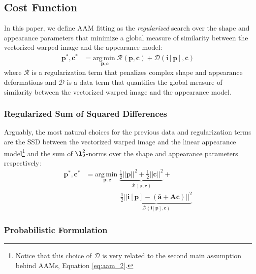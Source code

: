 \subsection{Cost Function}
\label{sec:cost_function}

In this paper, we define AAM fitting as the \emph{regularized} search over the shape and appearance parameters that minimize a global measure of similarity between the vectorized warped image and the appearance model:
\begin{equation}
    \begin{aligned}
        \mathbf{p}^*, \mathbf{c}^* & = \underset{\mathbf{p}, \mathbf{c}} {\mathrm{arg\, min\;}} \mathcal{R} (\mathbf{p}, \mathbf{c}) + \mathcal{D} (\mathbf{i}[\mathbf{p}], \mathbf{c}) 
        \end{aligned}
    \label{eq:aam_fitting}
\end{equation}
where $\mathcal{R}$ is a regularization term that penalizes complex shape and appearance deformations and $\mathcal{D}$ is a data term that
quantifies the global measure of similarity between the vectorized warped image and the appearance model.

\subsubsection{Regularized Sum of Squared Differences}
\label{sec:rssd}

Arguably, the most natural choices for the previous data and regularization terms are the SSD between the vectorized warped image and the linear appearance model\footnote{Notice that this choice of $\mathcal{D}$ is very related to the second main assumption behind AAMs, Equation \ref{eq:aam_2}.} and the sum of $\l_2^2$-norms over the shape and appearance parameters respectively:
\begin{equation}
    \begin{aligned}
        \mathbf{p}^*, \mathbf{c}^* & = \underset{\mathbf{p}, \mathbf{c}} {\mathrm{arg\, min\;}} \underbrace{\frac{1}{2}||\mathbf{p}||^2 + \frac{1}{2}||\mathbf{c}||^2}_{\mathcal{R} (\mathbf{p}, \mathbf{c})} +
        \\
        & \qquad \qquad \quad \underbrace{\frac{1}{2}|| \mathbf{i}[\mathbf{p}] - (\mathbf{\bar{a}} + \mathbf{A} \mathbf{c}) ||^2}_{\mathcal{D} (\mathbf{i}[\mathbf{p}], \mathbf{c})}
    \end{aligned}
    \label{eq:rssd}
\end{equation}
\subsubsection*{Probabilistic Formulation}
\label{sec:rssd_pi}

